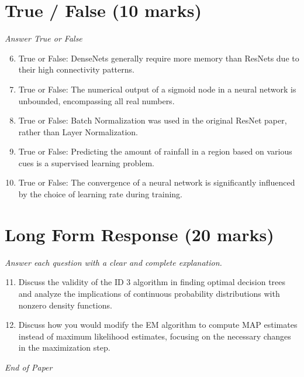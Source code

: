 \documentclass[12pt]{article}
\begin{document}
\section*{True / False (10 marks)}
\textit{Answer True or False}
\begin{enumerate}[label=\arabic*.]
\setcounter{enumi}{5}
\item True or False: DenseNets generally require more memory than ResNets due to their high connectivity patterns.
\item True or False: The numerical output of a sigmoid node in a neural network is unbounded, encompassing all real numbers.
\item True or False: Batch Normalization was used in the original ResNet paper, rather than Layer Normalization.
\item True or False: Predicting the amount of rainfall in a region based on various cues is a supervised learning problem.
\item True or False: The convergence of a neural network is significantly influenced by the choice of learning rate during training.
\end{enumerate}

\section*{Long Form Response (20 marks)}
\textit{Answer each question with a clear and complete explanation.}
\begin{enumerate}[label=\arabic*.]
\setcounter{enumi}{10}
\item Discuss the validity of the ID 3 algorithm in finding optimal decision trees and analyze the implications of continuous probability distributions with nonzero density functions.
\item Discuss how you would modify the EM algorithm to compute MAP estimates instead of maximum likelihood estimates, focusing on the necessary changes in the maximization step.
\end{enumerate}

\vfill
\noindent\textit{End of Paper}
\end{document}
